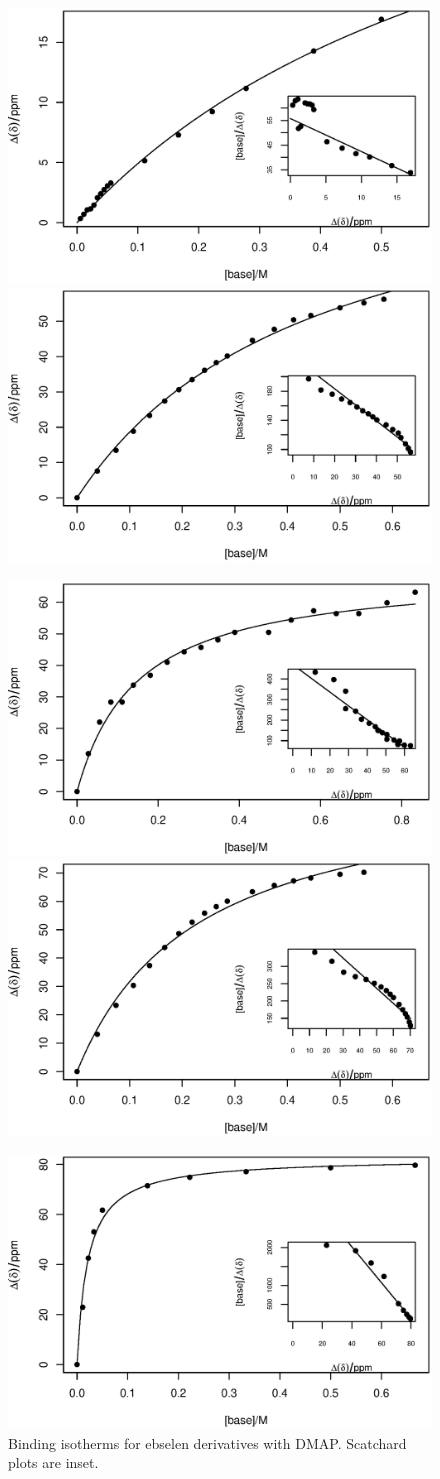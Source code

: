 \begin{figure}
    \centering
    \includegraphics[width=0.48\linewidth]{Figures/nmr-titration/bn-ebs-dmap.eps}
    \includegraphics[width=0.48\linewidth]{Figures/nmr-titration/4oet-ebs-dmap.eps}
    
    \includegraphics[width=0.48\linewidth]{Figures/nmr-titration/ebs-dmap.eps}
    \includegraphics[width=0.48\linewidth]{Figures/nmr-titration/4br-ebs-dmap.eps}
    
    \includegraphics[width=0.48\linewidth]{Figures/nmr-titration/4cn-ebs-dmap.eps}
    \caption[NMR titration binding isotherms]{Binding isotherms for ebselen derivatives  with DMAP. Scatchard plots are inset.}
    \label{fig:nmr-titrations}
\end{figure}

